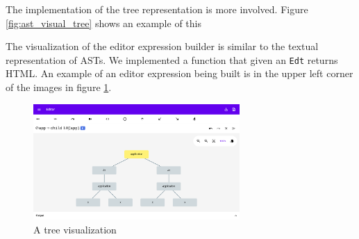 The implementation of the tree representation is more involved. Figure
\ref{fig:ast_visual_tree} shows an example of this

The visualization of the editor expression builder is similar to the textual
representation of ASTs. We implemented a function that given an \texttt{Edt}
returns HTML. An example of an
editor expression being built is in the upper left corner of the images in
figure \ref{fig:final_ui}.

\begin{figure}
  \begin{center}
      \includegraphics[width=0.7\textwidth]{assets/final_ui1.png}
 \end{center}
  \caption{A tree visualization}
  \label{fig:final_ui}
\end{figure}



